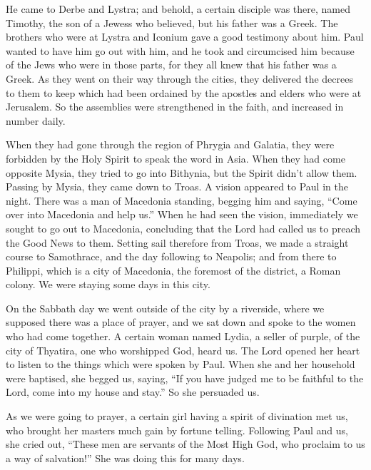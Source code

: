  He came to Derbe and Lystra; and behold, a certain disciple
was there, named Timothy, the son of a Jewess who believed, but his
father was a Greek.  The brothers who were at Lystra and
Iconium gave a good testimony about him.  Paul wanted to
have him go out with him, and he took and circumcised him because of the
Jews who were in those parts, for they all knew that his father was a
Greek.  As they went on their way through the cities, they
delivered the decrees to them to keep which had been ordained by the
apostles and elders who were at Jerusalem.  So the
assemblies were strengthened in the faith, and increased in number
daily.

 When they had gone through the region of Phrygia and
Galatia, they were forbidden by the Holy Spirit to speak the word in
Asia.  When they had come opposite Mysia, they tried to go
into Bithynia, but the Spirit didn't allow them.  Passing by
Mysia, they came down to Troas.  A vision appeared to Paul
in the night. There was a man of Macedonia standing, begging him and
saying, ``Come over into Macedonia and help us.''  When he
had seen the vision, immediately we sought to go out to Macedonia,
concluding that the Lord had called us to preach the Good News to them.
 Setting sail therefore from Troas, we made a straight
course to Samothrace, and the day following to Neapolis; 
and from there to Philippi, which is a city of Macedonia, the foremost
of the district, a Roman colony. We were staying some days in this city.

 On the Sabbath day we went outside of the city by a
riverside, where we supposed there was a place of prayer, and we sat
down and spoke to the women who had come together.  A
certain woman named Lydia, a seller of purple, of the city of Thyatira,
one who worshipped God, heard us. The Lord opened her heart to listen to
the things which were spoken by Paul.  When she and her
household were baptised, she begged us, saying, ``If you have judged me
to be faithful to the Lord, come into my house and stay.'' So she
persuaded us.

 As we were going to prayer, a certain girl having a spirit
of divination met us, who brought her masters much gain by fortune
telling.  Following Paul and us, she cried out, ``These men
are servants of the Most High God, who proclaim to us a way of
salvation!''  She was doing this for many days.

